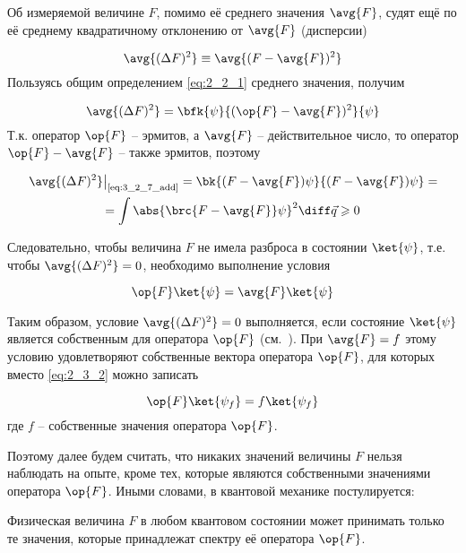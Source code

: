 Об измеряемой величине $F$, помимо её среднего значения $\avg{F}$, судят ещё по её среднему квадратичному отклонению от $\avg{F}$ (дисперсии)

\begin{equation}
\label{eq:3_2_10}
\avg{(\Delta F)^2} \equiv \avg{(F - \avg{F})^2}
\end{equation}%
%
Пользуясь общим определением \eqref{eq:2_2_1} среднего значения, получим

\begin{equation}
\label{eq:3_2_11}
\avg{(\Delta F)^2} = \bfk{\psi}{(\op{F} - \avg{F})^2}{\psi}
\end{equation}%
%
Т.к. оператор $\op{F}$ -- эрмитов, а $\avg{F}$ -- действительное число, то оператор $\op{F} - \avg{F}$ -- также эрмитов, поэтому

\begin{equation}
\label{eq:3_2_12}
\begin{gathered}
\left. \avg{(\Delta F)^2} \right|_{\text{\eqref{eq:3_2_7_add}}} =
  \bk{(F - \avg{F})\psi}{(F - \avg{F})\psi} = \\ =
  \int \abs{\brc{F - \avg{F}}\psi}^2\diff\vec{q} \geqslant 0
\end{gathered}
\end{equation}

Следовательно, чтобы величина $F$ не имела разброса в состоянии $\ket{\psi}$, т.е. чтобы $\avg{(\Delta F)^2} = 0$, необходимо выполнение условия

\begin{equation}
\label{eq:3_2_13}
\op{F}\ket{\psi} = \avg{F}\ket{\psi}
\end{equation}

Таким образом, условие $\avg{(\Delta F)^2} = 0$ выполняется, если состояние $\ket{\psi}$ является собственным для оператора $\op{F}$ (см.~). При $\avg{F} = f$ этому условию удовлетворяют собственные вектора оператора $\op{F}$, для которых вместо \eqref{eq:2_3_2} можно записать

\begin{equation}
\label{eq:3_2_14}
\op{F}\ket{\psi_{f}} = f \ket{\psi_{f}}
\end{equation}%
%
где $f$ -- собственные значения оператора $\op{F}$.

Поэтому далее будем считать, что никаких значений величины $F$ нельзя наблюдать на опыте, кроме тех, которые являются собственными значениями оператора $\op{F}$. Иными словами, в квантовой механике постулируется:
\begin{stmt}
Физическая величина $F$ в любом квантовом состоянии может принимать только те значения, которые принадлежат спектру её оператора $\op{F}$.
\end{stmt}

